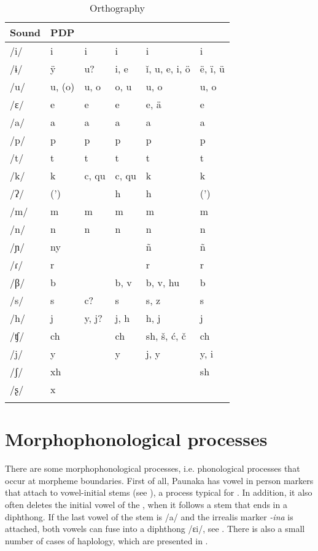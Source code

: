 \begin{table}
\caption{Orthography}

\begin{tabularx}{\textwidth}{llQQQQ}
\lsptoprule  
 Sound & PDP & \citealt{Orbigny1839} & \citealt{Cardus1886} & \mbox{\citealt{Riester1955}}\newline\citeyear*{Riester1965, Riesters.d.} & \citealt{Villafanen.d.} \\
\midrule
/i/ & i & i & i & i & i \\
/ɨ/ & ÿ & u? & i, e & ǐ, u, e, i, ö & ë, ï, ü\\
/u/ & u, (o) & u, o & o, u & u, o & u, o\\
/ɛ/ & e & e & e & e, ä & e\\
/a/ & a & a & a & a & a\\
/p/ & p & p & p & p & p \\
/t/ & t & t & t & t & t\\
/k/ & k & c, qu & c, qu & k & k\\
/ʔ/ & (') & & h & h & (')\\
/m/ & m & m & m & m & m \\
/n/ & n & n & n & n & n \\
/ɲ/ & ny & & & ñ & ñ\\
/ɾ/ & r & & & r & r \\
/β/ & b & & b, v & b, v, hu & b \\
/s/ & s & c? & s & s, z & s \\
/h/ & j & y, j? & j, h & h, j & j \\
/ʧ/ & ch & & ch & sh, š, ć, č & ch \\
/j/ & y & & y & j, y & y, i\\
/ʃ/ & xh & & & & sh \\
/ʂ/ & x & & & & \\
\lspbottomrule
\end{tabularx}

\label{table:Orthography}
\end{table}
	
\section{Morphophonological processes} \label{sec:PhonProcesses}

There are some morphophonological processes, i.e. phonological processes that occur at morpheme boundaries. First of all, Paunaka has vowel  in person markers that attach to vowel-initial stems (see ), a process typical for . In addition, it also often deletes the initial vowel of the , when it follows a stem that ends in a diphthong. If the last vowel of the stem is /a/ and the irrealis marker \textit{-ina} is attached, both vowels can fuse into a diphthong /ɛi/, see . There is also a small number of cases of haplology, which are presented in .

